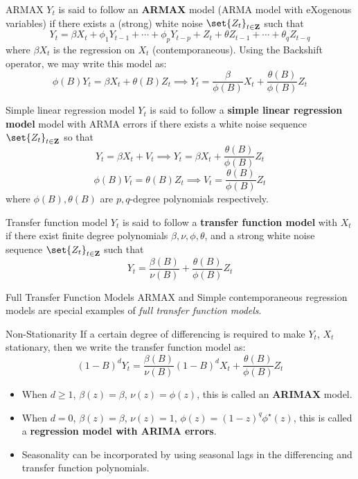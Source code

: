 \begin{Definition}{ARMAX}{}
    $ Y_t $ is said to follow an \textbf{ARMAX} model (ARMA model with eXogenous variables)
    if there exists a (strong) white noise $ \set{Z_t}_{t\in\mathbf{Z}} $
    such that
    \[ Y_t=\beta X_t+\phi_1 Y_{t-1}+\cdots+\phi_p Y_{t-p}+Z_t+\theta Z_{t-1}+\cdots+\theta_q Z_{t-q} \]
    where $ \beta X_t $ is the regression on $ X_t $ (contemporaneous). Using the Backshift
    operator, we may write this model as:
    \[ \phi(B)Y_t=\beta X_t+\theta(B)Z_t\implies Y_t=\frac{\beta}{\phi(B)}X_t +\frac{\theta(B)}{\phi(B)} Z_t \]
\end{Definition}
\begin{Definition}{Simple linear regression model}{}
    $ Y_t $ is said to follow a \textbf{simple linear regression model} model
    with ARMA errors if there exists a white noise sequence $ \set{Z_t}_{t\in\mathbf{Z}} $
    so that
    \[ Y_t=\beta X_t+V_t\implies Y_t=\beta X_t+\frac{\theta(B)}{\phi(B)} Z_t \]
    \[ \phi(B)V_t=\theta(B)Z_t\implies V_t=\frac{\theta(B)}{\phi(B)} Z_t \]
    where $ \phi(B),\theta(B) $ are $ p,q $-degree polynomials respectively.
\end{Definition}
\begin{Definition}{Transfer function model}{}
    $ Y_t $ is said to follow a \textbf{transfer function model} with $ X_t $
    if there exist finite degree polynomials $ \beta,\nu,\phi,\theta $, and a strong
    white noise sequence $ \set{Z_t}_{t\in\mathbf{Z}} $ such that
    \[ Y_t=\frac{\beta(B)}{\nu(B)} +\frac{\theta(B)}{\phi(B)} Z_t \]
\end{Definition}
\begin{Example}{Full Transfer Function Models}{}
    ARMAX and Simple contemporaneous regression models are special examples
    of \emph{full transfer function models}.
\end{Example}
\begin{Remark}{Non-Stationarity}{}
    If a certain degree of differencing is required to make $ Y_t $, $ X_t $
    stationary, then we write the transfer function model as:
    \[ (1-B)^d Y_t=\frac{\beta(B)}{\nu(B)} (1-B)^d X_t+\frac{\theta(B)}{\phi(B)} Z_t \]
    \begin{itemize}
        \item When $ d\ge 1 $, $ \beta(z)=\beta $, $ \nu(z)=\phi(z) $, this is called
              an \textbf{ARIMAX} model.
        \item When $ d=0 $, $ \beta(z)=\beta $, $ \nu(z)=1 $, $ \phi(z)=(1-z)^q \phi^\star (z) $,
              this is called a \textbf{regression model with ARIMA errors}.
        \item Seasonality can be incorporated by using seasonal lags in the differencing
              and transfer function polynomials.
    \end{itemize}
\end{Remark}

